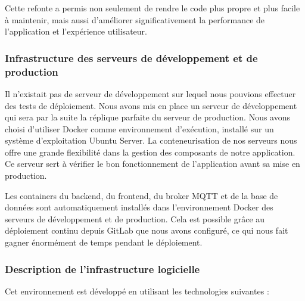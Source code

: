 Cette refonte a permis non seulement de rendre le code plus propre et plus facile à maintenir, mais aussi d'améliorer significativement la performance de l'application et l'expérience utilisateur.


\subsubsection{Infrastructure des serveurs de développement et de production}

Il n'existait pas de serveur de développement sur lequel nous pouvions effectuer des tests de déploiement. Nous avons mis en place un serveur de développement qui sera par la suite la réplique parfaite du serveur de production.
Nous avons choisi d'utiliser Docker comme environnement d'exécution, installé sur un système d'exploitation Ubuntu Server.
La conteneurisation de nos serveurs nous offre une grande flexibilité dans la gestion des composants de notre application.
Ce serveur sert à vérifier le bon fonctionnement de l'application avant sa mise en production.

Les containers du backend, du frontend, du broker MQTT et de la base de données sont automatiquement installés dans l'environnement Docker des serveurs de développement et de production.
Cela est possible grâce au déploiement continu depuis GitLab que nous avons configuré, ce qui nous fait gagner énormément de temps pendant le déploiement.


\subsubsection{Description de l'infrastructure logicielle}

Cet environnement est développé en utilisant les technologies suivantes :

